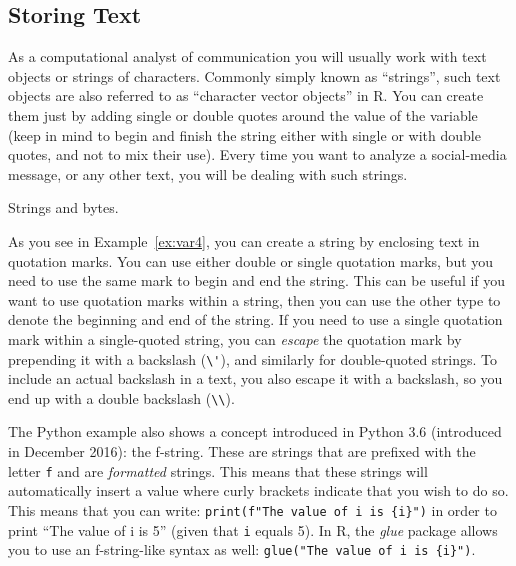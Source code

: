 \subsection{Storing Text}\label{sec:storingtext}

As a computational analyst of communication you will usually work with
text objects or strings of characters. Commonly simply known as ``strings'',
such text objects are also referred to as ``character vector objects'' in R.
You can create them just by adding single or double quotes around the value of the variable (keep in mind to begin and finish the string either with single or with double quotes, and not to mix their use). Every time you want to analyze a social-media message, or any other text, you will be dealing with such strings. 

\begin{ccsexample}
  \caption{Strings and bytes.}\label{ex:var4}
 \end{ccsexample}

As you see in Example~\ref{ex:var4}, you can create a string by enclosing  text in quotation
marks. You can use either double or single quotation marks, but you
need to use the same mark to begin and end the string. This can be
useful if you want to use quotation marks within a string, then you can
use the other type to denote the beginning and end of the string.
If you need to use a single quotation mark within a single-quoted string,
you can \emph{escape} the quotation mark by prepending it with a backslash (\verb|\'|),
and similarly for double-quoted strings.
To include an actual backslash in a text, you also escape it with a backslash,
so you end up with a double backslash (\verb|\\|). 

The Python example also shows a concept introduced in Python 3.6 (introduced in December 2016):
the f-string. These are strings that are prefixed with the letter \texttt{f} and are \emph{formatted} strings.
This means that these strings will automatically insert a value where curly brackets indicate that you wish to do so.
This means that you can write: \verb|print(f"The value of i is {i}")| in order to print ``The value of i is 5'' (given that \verb|i| equals 5).
In R, the \emph{glue} package allows you to use an f-string-like syntax as well: \texttt{glue("The value of i is \{i\}")}.

